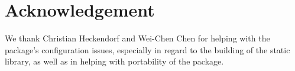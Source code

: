 \section*{Acknowledgement}

We thank Christian Heckendorf and Wei-Chen Chen for helping with the 
package's configuration issues, especially in regard to the building of the
static library, as well as in helping with portability of the package.
